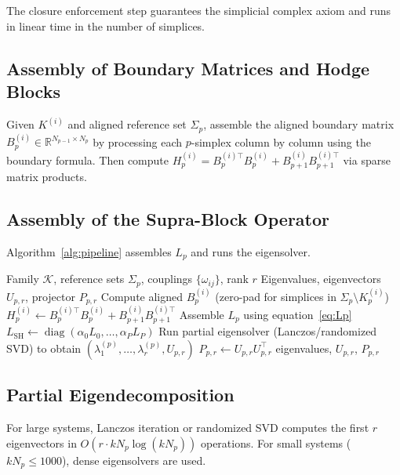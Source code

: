 \documentclass[11pt]{article}
\theoremstyle{definition}
\theoremstyle{remark}
\newcommand{\R}{\mathbb{R}}
\newcommand{\LSH}{L_{\mathrm{SH}}}
\newcommand{\Pp}{P_{p,r}}
\newcommand{\Up}{U_{p,r}}
\newcommand{\calK}{\mathcal{K}}
\DeclareMathOperator{\diag}{diag}
\begin{document}
The closure enforcement step guarantees the simplicial complex axiom and runs
in linear time in the number of simplices.

\subsection{Assembly of Boundary Matrices and Hodge Blocks}

Given $K^{(i)}$ and aligned reference set $\Sigma_p$, assemble the aligned
boundary matrix $B_p^{(i)}\in\R^{N_{p-1}\times N_p}$ by processing each
$p$-simplex column by column using the boundary formula. Then compute
$H_p^{(i)} = B_p^{(i)\top}B_p^{(i)} + B_{p+1}^{(i)}B_{p+1}^{(i)\top}$ via
sparse matrix products.

\subsection{Assembly of the Supra-Block Operator}

Algorithm~\ref{alg:pipeline} assembles $L_p$ and runs the eigensolver.

\begin{algorithm}[h]
\caption{Supra-Hodge Pipeline}
\label{alg:pipeline}
\begin{algorithmic}[1]
\Require Family $\calK$, reference sets $\Sigma_p$, couplings $\{\omega_{ij}\}$, rank $r$
\Ensure Eigenvalues, eigenvectors $\Up$, projector $\Pp$
    \State Compute aligned $B_p^{(i)}$ (zero-pad for simplices in $\Sigma_p\setminus K_p^{(i)}$)
    \State $H_p^{(i)} \gets B_p^{(i)\top}B_p^{(i)} + B_{p+1}^{(i)}B_{p+1}^{(i)\top}$
  \EndFor
\EndFor
{}
  \State Assemble $L_p$ using equation~\eqref{eq:Lp}
\EndFor
\State $\LSH \gets \diag(\alpha_0 L_0,\dots,\alpha_P L_P)$
\State Run partial eigensolver (Lanczos/randomized SVD) to obtain $(\lambda_1^{(p)},\dots,\lambda_r^{(p)},\Up)$
\State $\Pp \gets \Up\Up^\top$
\State \Return eigenvalues, $\Up$, $\Pp$
\end{algorithmic}
\end{algorithm}

\subsection{Partial Eigendecomposition}

For large systems, Lanczos iteration or randomized SVD computes the first $r$
eigenvectors in $O(r\cdot kN_p\log(kN_p))$ operations. For small systems
($kN_p \leq 1000$), dense eigensolvers are used.
\end{document}
